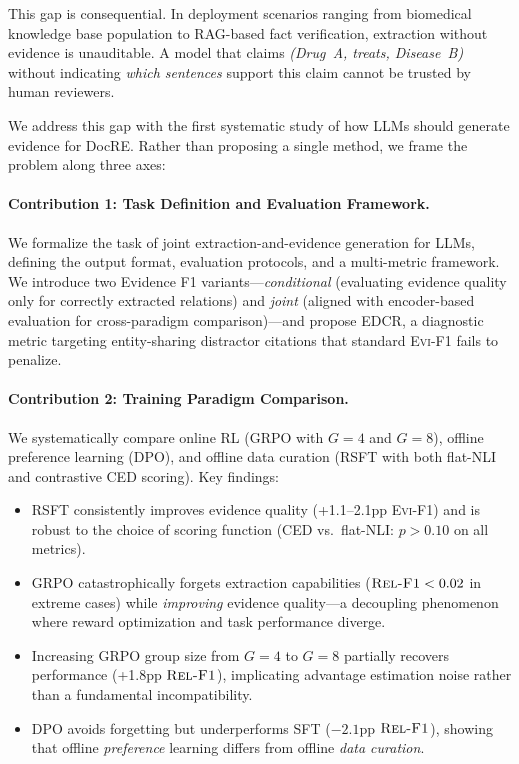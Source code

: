 \documentclass[11pt,a4paper]{article}
\newcommand{\evi}{\textsc{Evi-F1}}
\newcommand{\edcr}{\textsc{EDCR}}
\newcommand{\relf}{\textsc{Rel-F1}}
\begin{document}
This gap is consequential. In deployment scenarios ranging from biomedical knowledge base population to RAG-based fact verification, extraction without evidence is unauditable. A model that claims \textit{(Drug~A, treats, Disease~B)} without indicating \textit{which sentences} support this claim cannot be trusted by human reviewers.

We address this gap with the first systematic study of how LLMs should generate evidence for DocRE. Rather than proposing a single method, we frame the problem along three axes:

\paragraph{Contribution 1: Task Definition and Evaluation Framework.}
We formalize the task of joint extraction-and-evidence generation for LLMs, defining the output format, evaluation protocols, and a multi-metric framework. We introduce two Evidence F1 variants---\textit{conditional} (evaluating evidence quality only for correctly extracted relations) and \textit{joint} (aligned with encoder-based evaluation for cross-paradigm comparison)---and propose \edcr{}, a diagnostic metric targeting entity-sharing distractor citations that standard \evi{} fails to penalize.

\paragraph{Contribution 2: Training Paradigm Comparison.}
We systematically compare online RL (GRPO with $G{=}4$ and $G{=}8$), offline preference learning (DPO), and offline data curation (RSFT with both flat-NLI and contrastive CED scoring). Key findings:
\begin{itemize}
\item RSFT consistently improves evidence quality (+1.1--2.1pp \evi{}) and is robust to the choice of scoring function (CED vs.\ flat-NLI: $p{>}0.10$ on all metrics).
\item GRPO catastrophically forgets extraction capabilities ($\relf{}<0.02$ in extreme cases) while \textit{improving} evidence quality---a decoupling phenomenon where reward optimization and task performance diverge.
\item Increasing GRPO group size from $G{=}4$ to $G{=}8$ partially recovers performance (+1.8pp $\relf{}$), implicating advantage estimation noise rather than a fundamental incompatibility.
\item DPO avoids forgetting but underperforms SFT ($-2.1$pp $\relf{}$), showing that offline \textit{preference} learning differs from offline \textit{data curation}.
\end{itemize}
\end{document}
